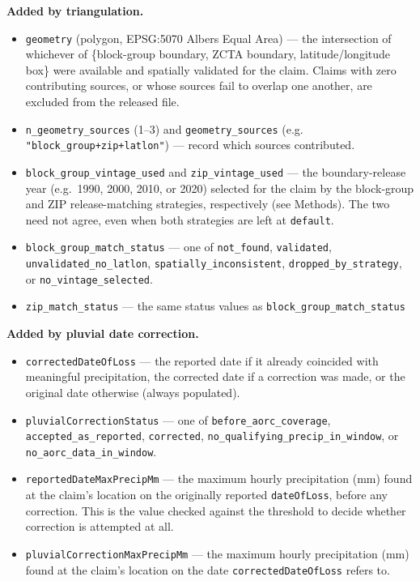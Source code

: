 \textbf{Added by triangulation.}
\begin{itemize}
  \item \texttt{geometry} (polygon, EPSG:5070 Albers Equal Area) --- the
    intersection of whichever of \{block-group boundary, ZCTA boundary,
    latitude/longitude box\} were available and spatially validated for the claim.
    Claims with zero contributing sources, or whose sources fail to
    overlap one another, are excluded from the released file.
  \item \texttt{n\_geometry\_sources} (1--3) and
    \texttt{geometry\_sources} (e.g. \texttt{"block\_group+zip+latlon"})
    --- record which sources contributed.
  \item \texttt{block\_group\_vintage\_used} and
    \texttt{zip\_vintage\_used} --- the boundary-release year (e.g.\
    1990, 2000, 2010, or 2020) selected for the claim by the
    block-group and ZIP release-matching strategies, respectively (see
    Methods). The two need not agree, even when both strategies are
    left at \texttt{default}.
  \item \texttt{block\_group\_match\_status} --- one of
    \texttt{not\_found}, \texttt{validated},
    \texttt{unvalidated\_no\_latlon}, \texttt{spatially\_inconsistent},
    \texttt{dropped\_by\_strategy}, or \texttt{no\_vintage\_selected}.
  \item \texttt{zip\_match\_status} --- the same status values as
    \texttt{block\_group\_match\_status}
\end{itemize}

\textbf{Added by pluvial date correction.}
\begin{itemize}
  \item \texttt{correctedDateOfLoss} --- the reported date if it
    already coincided with meaningful precipitation, the corrected date
    if a correction was made, or the original date otherwise (always
    populated).
  \item \texttt{pluvialCorrectionStatus} --- one of
    \texttt{before\_aorc\_coverage}, \texttt{accepted\_as\_reported},
    \texttt{corrected}, \texttt{no\_qualifying\_precip\_in\_window}, or
    \texttt{no\_aorc\_data\_in\_window}.
  \item \texttt{reportedDateMaxPrecipMm} --- the maximum hourly
    precipitation (mm) found at the claim's location on the originally
    reported \texttt{dateOfLoss}, before any correction. This is the
    value checked against the threshold to decide whether correction is
    attempted at all.
  \item \texttt{pluvialCorrectionMaxPrecipMm} --- the maximum hourly
    precipitation (mm) found at the claim's location on the date
    \texttt{correctedDateOfLoss} refers to.
\end{itemize}

